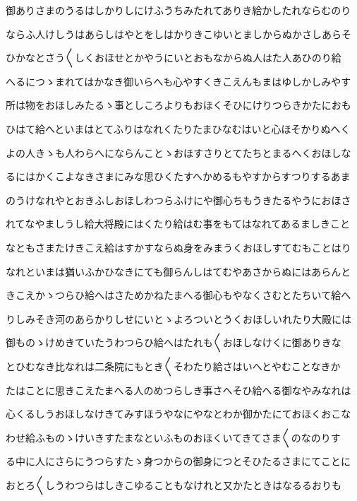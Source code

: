\documentclass[a4paper,11pt,landscape]{ltjtarticle}
\begin{document}
\par\medskip
御ありさまのうるはしかりしにけふうちみたれてありき給かしたれならむのり
\par\medskip
ならふ人けしうはあらしはやとをしはかりきこゆいとましからぬかさしあらそ
\par\medskip
ひかなとさう〱しくおほせとかやうにいとおもなからぬ人はた人あひのり給
\par\medskip
へるにつゝまれてはかなき御いらへも心やすくきこえんもまはゆしかしみやす
\par\medskip
所は物をおほしみたるゝ事としころよりもおほくそひにけりつらきかたにおも
\par\medskip
ひはて給へといまはとてふりはなれくたりたまひなむはいと心ほそかりぬへく
\par\medskip
よの人きゝも人わらへにならんことゝおほすさりとてたちとまるへくおほしな
\par\medskip
るにはかくこよなきさまにみな思ひくたすへかめるもやすからすつりするあま
\par\medskip
のうけなれやとおきふしおほしわつらふけにや御心ちもうきたるやうにおほさ
\par\medskip
れてなやましうし給大将殿にはくたり給はむ事をもてはなれてあるましきこと
\par\medskip
なともさまたけきこえ給はすかすならぬ身をみまうくおほしすてむもことはり
\par\medskip
なれといまは猶いふかひなきにても御らんしはてむやあさからぬにはあらんと
\par\medskip
きこえかゝつらひ給へはさためかねたまへる御心もやなくさむとたちいて給へ
\par\medskip
りしみそき河のあらかりしせにいとゝよろついとうくおほしいれたり大殿には
\par\medskip
御ものゝけめきていたうわつらひ給へはたれも〱おほしなけくに御ありきな
\par\medskip
とひむなき比なれは二条院にもとき〱そわたり給さはいへとやむことなきか
\par\medskip
たはことに思きこえたまへる人のめつらしき事さへそひ給へる御なやみなれは
\par\medskip
心くるしうおほしなけきてみすほうやなにやなとわか御かたにておほくおこな
\par\medskip
わせ給ふものゝけいきすたまなといふものおほくいてきてさま〱のなのりす
\par\medskip
る中に人にさらにうつらすたゝ身つからの御身につとそひたるさまにてことに
\par\medskip
おとろ〱しうわつらはしきこゆることもなけれと又かたときはなるるおりも
\par\medskip
\end{document}
